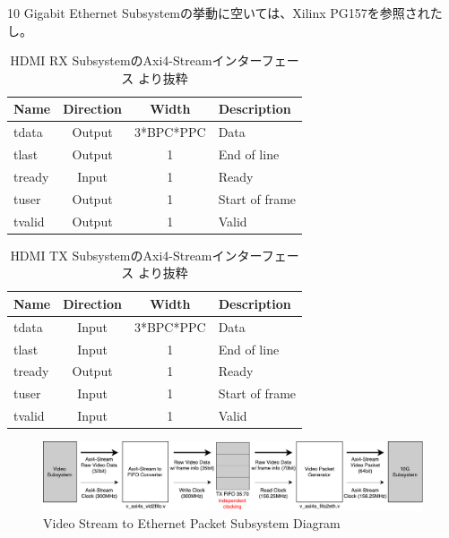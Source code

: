 10 Gigabit Ethernet Subsystemの挙動に空いては、Xilinx PG157\cite{xilinx-pg157}を参照されたし。
\cite{xilinx-pg235}
\cite{xilinx-pg236}

\begin{table}[htbp]
  \caption{HDMI RX SubsystemのAxi4-Streamインターフェース \cite{xilinx-pg236}より抜粋}
  \label{tb:pg236-vout-axi4-stream}
  \begin{center}
  \begin{tabular}{l|c|c|l}
    \hline
    Name   & Direction & Width     & Description \\\hline\hline
    tdata  & Output    & 3*BPC*PPC & Data \\\hline
    tlast  & Output    & 1         & End of line \\\hline
    tready & Input     & 1         & Ready \\\hline
    tuser  & Output    & 1         & Start of frame \\\hline
    tvalid & Output    & 1         & Valid \\\hline
  \end{tabular}\end{center}
\end{table}

\begin{table}[htbp]
  \caption{HDMI TX SubsystemのAxi4-Streamインターフェース \cite{xilinx-pg235}より抜粋}
  \label{tb:pg236-vin-axi4-stream}
  \begin{center}
  \begin{tabular}{l|c|c|l}
    \hline
    Name   & Direction & Width     & Description \\\hline\hline
    tdata  & Input     & 3*BPC*PPC & Data \\\hline
    tlast  & Input     & 1         & End of line \\\hline
    tready & Output    & 1         & Ready \\\hline
    tuser  & Input     & 1         & Start of frame \\\hline
    tvalid & Input     & 1         & Valid \\\hline
  \end{tabular}\end{center}
\end{table}

\begin{figure}[htbp]
    \begin{center}
        \includegraphics[bb=0 0 911 166,width=15.5cm]{img/fpga-video-ethernet-diagram.pdf}
    \end{center}
    \caption{Video Stream to Ethernet Packet Subsystem Diagram}
    \label{fig:fpga-video-ethernet-diagram}
\end{figure}

